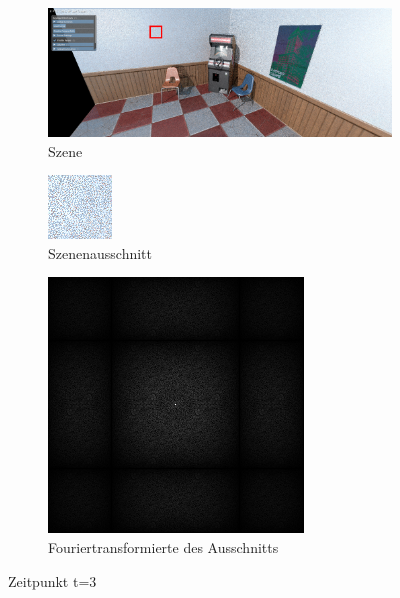 \begin{figure}[H]
    \begin{subfigure}{\textwidth}
        \centering \includegraphics[scale=.2]{content/TemporalerAlg/Bilder/Screenshotreihe/frame_t_4.0.png}
        \caption{Szene}
        \label{fig:Szene_t1}
    \end{subfigure}
    \begin{subfigure}{0.5\textwidth}
        \centering\includegraphics[width=0.5\linewidth]{content/TemporalerAlg/Bilder/Screenshotreihe/frame_t_4.0_64x64.png} 
        \caption{Szenenausschnitt}
        \label{fig:ausschnitt_t3}
    \end{subfigure}
    \begin{subfigure}{0.5\textwidth}
        \centering\includegraphics[width=0.5\linewidth]{content/TemporalerAlg/Bilder/Screenshotreihe/spektrum/frame_t_4.0_64x64_fourier.png}
        \caption{Fouriertransformierte des Ausschnitts}
        \label{fig:Fouriertransformierte_t3}
    \end{subfigure}
        \caption{Zeitpunkt t=3}
        \label{fig:Verlauf_t3}
\end{figure}

